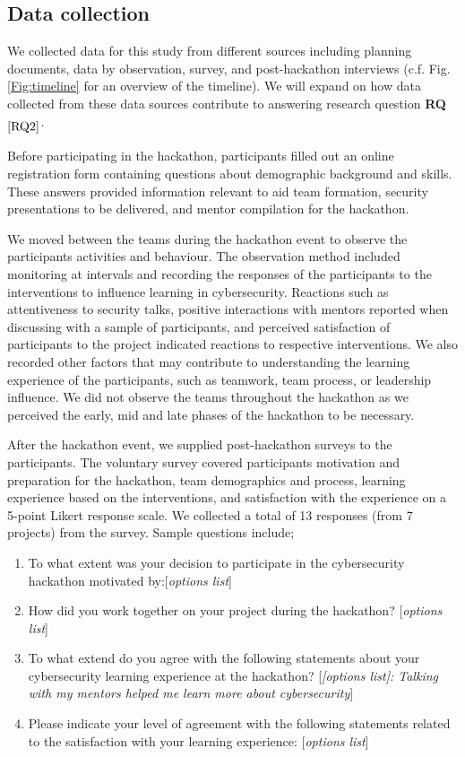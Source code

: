 \documentclass[runningheads]{llncs}
\newcommand{\hr}[1]{\textbf{RQ}$_{\ref{#1}}$}
\begin{document}
\subsection{Data collection}
We collected data for this study from different sources including planning documents, data by observation, survey, and post-hackathon interviews (c.f. Fig. \ref{Fig:timeline} for an overview of the timeline).  We will expand on how data collected from these data sources contribute to answering research question \hr{RQ2}.

Before participating in the hackathon, participants filled out an online registration form containing questions about demographic background and skills. These answers provided information relevant to aid team formation, security presentations to be delivered, and mentor compilation for the hackathon.

We moved between the teams during the hackathon event to observe the participants activities and behaviour. The observation method included monitoring at intervals and recording the responses of the participants to the interventions to influence learning in cybersecurity. Reactions such as attentiveness to security talks, positive interactions with mentors reported when discussing with a sample of participants, and perceived satisfaction of participants to the project indicated reactions to respective interventions. We also recorded other factors that may contribute to understanding the learning experience of the participants, such as teamwork, team process, or leadership influence.
We did not observe the teams throughout the hackathon as we perceived the early, mid and late phases of the hackathon to be necessary.

After the hackathon event, we supplied post-hackathon surveys to the participants. The voluntary survey covered participants motivation and preparation for the hackathon, team demographics and process, learning experience based on the interventions, and satisfaction with the experience on a 5-point Likert response scale. We collected a total of 13 responses (from 7 projects)  from the survey. Sample questions include; 
\begin{enumerate}
    \item To what extent was your decision to participate in the cybersecurity hackathon motivated by:[\textit{options list}]
    \item How did you work together on your project during the hackathon? [\textit{options list}]
    \item To what extend do you agree with the following statements about your cybersecurity learning experience at the hackathon? [\textit{[options list]: Talking with my mentors helped me learn more about cybersecurity}]
    \item Please indicate your level of agreement with the following statements related to the satisfaction with your learning experience: [\textit{options list}]
\end{enumerate}
\end{document}
